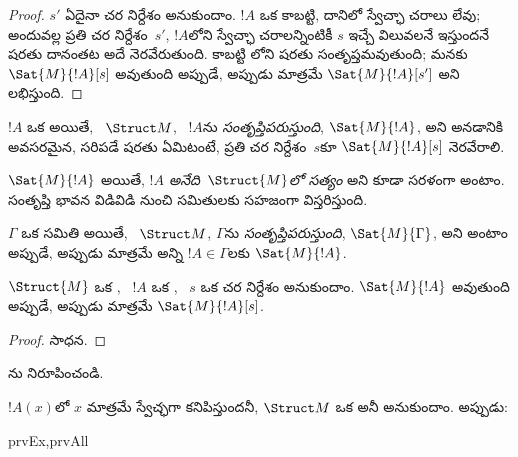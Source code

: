 \documentclass[../../../include/open-logic-section]{subfiles}
\begin{document}
\begin{proof}
  $s'$ ఏదైనా చర నిర్దేశం అనుకుందాం. $!A$ ఒక  కాబట్టి,
  దానిలో స్వేచ్ఛా చరాలు లేవు; అందువల్ల ప్రతి చర నిర్దేశం~$s'$,
  $!A$లోని స్వేచ్ఛా చరాలన్నింటికీ $s$ ఇచ్చే విలువలనే ఇస్తుందనే
  షరతు దానంతట అదే నెరవేరుతుంది. కాబట్టి లోని షరతు
  సంతృప్తమవుతుంది; మనకు $\Sat{M}{!A}[s]$ అవుతుంది అప్పుడే, అప్పుడు
  మాత్రమే $\Sat{M}{!A}[s']$ అని లభిస్తుంది.
\end{proof}

\begin{defn}
$!A$ ఒక  అయితే, ~$\Struct M$, ~$!A$ను
\emph{సంతృప్తిపరుస్తుంది}, $\Sat{M}{!A}$, అని అనడానికి అవసరమైన, సరిపడే షరతు ఏమిటంటే,
ప్రతి చర నిర్దేశం~$s$కూ $\Sat{M}{!A}[s]$ నెరవేరాలి.
\end{defn}

$\Sat{M}{!A}$ అయితే, \emph{$!A$ అనేది~$\Struct{M}$లో సత్యం} అని కూడా
సరళంగా అంటాం. సంతృప్తి భావన విడివిడి  నుంచి
 సమితులకు సహజంగా విస్తరిస్తుంది.

\begin{defn}
$\Gamma$ ఒక  సమితి అయితే, ~$\Struct M$,
$\Gamma$ను \emph{సంతృప్తిపరుస్తుంది}, $\Sat{M}{\Gamma}$, అని అంటాం
అప్పుడే, అప్పుడు మాత్రమే అన్ని $!A \in \Gamma$లకు $\Sat{M}{!A}$.
\end{defn}

\begin{prop}
  $\Struct{M}$ ఒక , ~$!A$ ఒక , ~$s$ ఒక చర
  నిర్దేశం అనుకుందాం. $\Sat{M}{!A}$ అవుతుంది అప్పుడే, అప్పుడు మాత్రమే
  $\Sat{M}{!A}[s]$.
\end{prop}

\begin{proof}
సాధన.
\end{proof}

\begin{prob}
ను నిరూపించండి.
\end{prob}

\begin{prop}
  $!A(x)$లో $x$ మాత్రమే స్వేచ్ఛగా కనిపిస్తుందనీ, $\Struct M$ ఒక
   అనీ అనుకుందాం. అప్పుడు:
  \begin{tagenumerate}{prvEx,prvAll}
\end{tagenumerate}
\end{prop}
\end{document}
